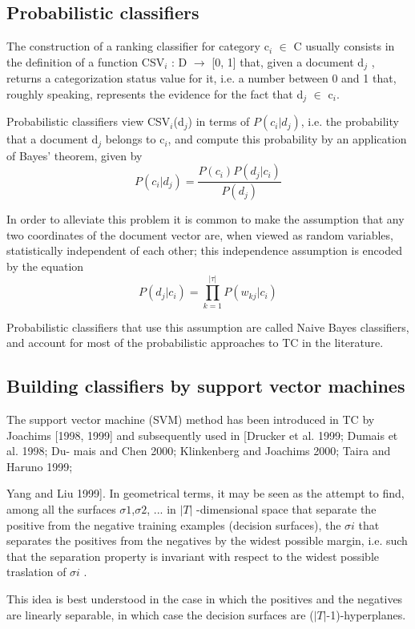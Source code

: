 \subsection{Probabilistic classifiers}
The construction of a ranking classifier for category c$_{i}$ $\in$ C usually
consists in the definition of a function CSV$_{i}$ : D $\rightarrow$ [0, 1] that, given a document d$_{j}$ , returns a categorization status value for it, i.e. a number between 0 and 1 that, roughly speaking, represents the evidence for the fact that d$_{j}$ $\in$ c$_{i}$.

Probabilistic classifiers view CSV$_{i}$(d$_{j}$) in terms of $P(c_{i} | d_{j})$, i.e. the probability that a document d$_{j}$ belongs to c$_{i}$, and compute this probability by an application of Bayes’ theorem, given by \[ P(c_{i}|d_{j}) = \frac{P(c_{i})P(d_{j}|c_{i})}{P(d_{j})} \]

In order to alleviate this problem it is common to make the assumption that any two coordinates of the document vector are, when viewed as random variables, statistically independent of each other; this independence assumption is encoded by the equation
\[ P(d_{j}|c_{i}) = \prod_{k=1}^{|\tau|} P(w_{kj}|c_{i}) \]

Probabilistic classifiers that use this assumption are called Naive Bayes classifiers, and account for most of the probabilistic approaches to TC in the literature.

\subsection{Building classifiers by support vector machines}
The support vector machine (SVM) method has been introduced in TC by Joachims [1998, 1999] and subsequently used in [Drucker et al. 1999; Dumais et al. 1998; Du- mais and Chen 2000; Klinkenberg and Joachims 2000; Taira and Haruno 1999;

Yang and Liu 1999]. In geometrical terms, it may be seen as the attempt to
find, among all the surfaces $\sigma 1$,$ \sigma 2$, ... in $|T|$ -dimensional
space that separate the positive from the negative training examples (decision
        surfaces), the $\sigma i$ that separates the positives from the negatives by the widest possible margin, i.e. such that the separation property is invariant with respect to the widest possible traslation of $\sigma i$ .

This idea is best understood in the case in which the positives and the
negatives are linearly separable, in which case the decision surfaces are
($|T|$-1)-hyperplanes.

